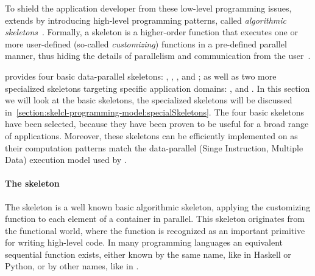 To shield the application developer from these low-level programming issues, \SkelCL extends \OpenCL by introducing high-level programming patterns, called \emph{algorithmic skeletons}~\cite{Cole1991}.
Formally, a skeleton is a higher-order function that executes one or more user-defined (so-called \emph{customizing}) functions in a pre-defined parallel manner, thus hiding the details of parallelism and communication from the user~\cite{GorlatchCo2011}.

\SkelCL provides four basic data-parallel skeletons: \map, \zip, \reduce, and \scan;
as well as two more specialized skeletons targeting specific application domains: \stencil, and \allpairs.
In this section we will look at the basic skeletons, the specialized skeletons will be discussed in~\autoref{section:skelcl-programming-model:specialSkeletons}.
The four basic skeletons have been selected, because they have been proven to be useful for a broad range of applications.
Moreover, these skeletons can be efficiently implemented on \GPUs as their computation patterns match the data-parallel \SIMD (Singe Instruction, Multiple Data) execution model used by \GPUs.


\paragraph{The \map skeleton}
The \map skeleton is a well known basic algorithmic skeleton, applying the customizing function to each element of a container in parallel.
This skeleton originates from the functional world, where the  function is recognized as an important primitive for writing high-level code.
In many programming languages an equivalent sequential function exists, either known by the same name, like in Haskell or Python, or by other names, like  in \Cpp.


